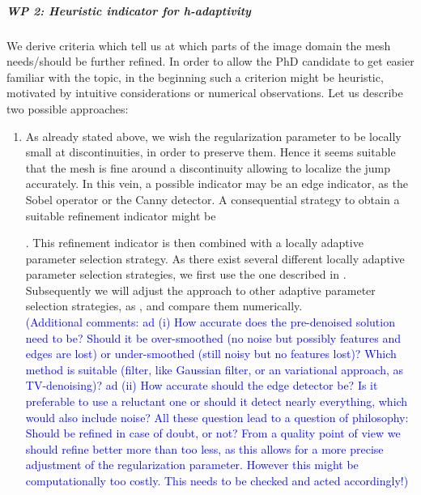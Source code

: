 \documentclass[enabledeprecatedfontcommands,cleardoublepage=empty,headsepline,twoside,11pt,DIV=15,BCOR=12mm,final]{scrartcl}
\begin{document}
 
 \subparagraph{WP 2: Heuristic indicator for h-adaptivity} We derive criteria which tell us at which parts of the image domain the mesh needs/should be further refined. In order to allow the PhD candidate to get easier familiar with the topic, in the beginning such a criterion might be heuristic, motivated by intuitive considerations or numerical observations. Let us describe two possible approaches:
\begin{enumerate}
 \item As already stated above, we wish the regularization parameter to be locally small at discontinuities, in order to preserve them. Hence it seems suitable that the mesh is fine around a discontinuity allowing to localize the jump accurately. In this vein, a possible indicator may be an edge indicator, as the Sobel operator or the Canny detector. A consequential strategy to obtain a suitable refinement indicator might be .
This refinement indicator is then combined with a locally adaptive parameter selection strategy. As there exist several different locally adaptive parameter selection strategies, we first use the one described in \cite{Lan}. Subsequently we will adjust the approach to other adaptive parameter selection strategies, as \cite{}, and compare them numerically.  \\
\textcolor{blue}{(Additional comments: ad (i) How accurate does the pre-denoised solution need to be? Should it be over-smoothed (no noise but possibly features and edges are lost) or under-smoothed (still noisy but no features lost)? Which method is suitable (filter, like Gaussian filter, or an variational approach, as TV-denoising)? ad (ii) How accurate should the edge detector be? Is it preferable to use a reluctant one or should it detect nearly everything, which would also include noise? All these question lead to a question of philosophy: Should be refined in case of doubt, or not? From a quality point of view we should refine better more than too less, as this allows for a more precise adjustment of the regularization parameter. However this might be computationally too costly. This needs to be checked and acted accordingly!)}


\end{enumerate}
\end{document}
